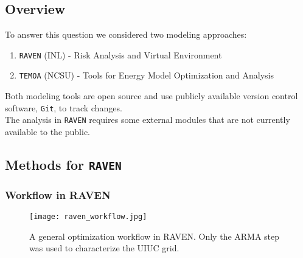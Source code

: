 \subsection{Overview}
\begin{frame}
    To answer this question we considered two modeling approaches:
    \begin{enumerate}
      \item \texttt{RAVEN} (INL) - Risk Analysis and Virtual Environment \cite{baker_optimal_2018}\cite{epiney_report_2017}
      \item \texttt{TEMOA} (NCSU) - Tools for Energy Model Optimization and Analysis \cite{decarolis_modelling_2016}\cite{decarolis_temoa_2010}\cite{hunter_modeling_2013}
    \end{enumerate}
    \vspace{0.5cm}
    Both modeling tools are open source and use publicly available version control
    software, \texttt{Git}, to track changes. \\

    The analysis in \texttt{RAVEN} requires some external modules that are not currently
    available to the public.
\end{frame}

\subsection{Methods for \texttt{RAVEN}}
\begin{frame}
  \frametitle{Workflow in RAVEN}
  \begin{figure}
    \texttt{[image: raven\_workflow.jpg]}
    \caption{A general optimization workflow in RAVEN. Only the ARMA step was used to characterize the UIUC grid.}
    \label{fig:workflow}
  \end{figure}
\end{frame}

